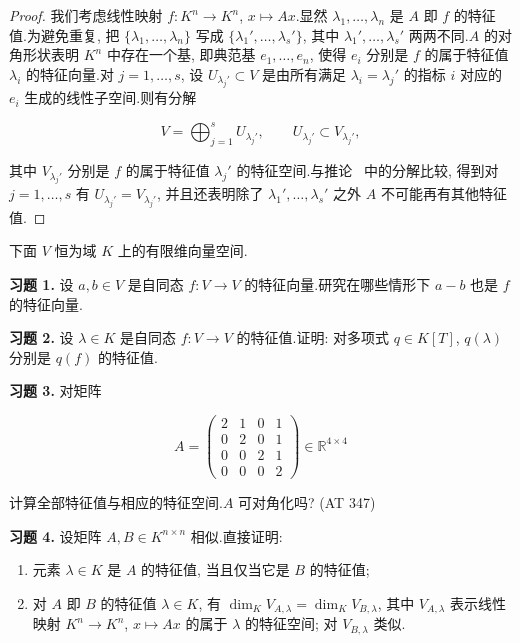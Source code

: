 \begin{proof}
我们考虑线性映射 $f \colon K^n \longrightarrow K^n$, $x \longmapsto Ax$.显然 $\lambda_1, \ldots, \lambda_n$ 是 $A$ 即 $f$ 的特征值.为避免重复, 把 $\{\lambda_1, \ldots, \lambda_n\}$ 写成 $\{\lambda_1', \ldots, \lambda_s'\}$, 其中 $\lambda_1', \ldots, \lambda_s'$ 两两不同.$A$ 的对角形状表明 $K^n$ 中存在一个基, 即典范基 $e_1, \ldots, e_n$, 使得 $e_i$ 分别是 $f$ 的属于特征值 $\lambda_i$ 的特征向量.对 $j = 1, \ldots, s$, 设 $U_{\lambda_j'} \subset V$ 是由所有满足 $\lambda_i = \lambda_j'$ 的指标 $i$ 对应的 $e_i$ 生成的线性子空间.则有分解

\[
V = \bigoplus_{j = 1}^{s} U_{\lambda_j'}, \qquad U_{\lambda_j'} \subset V_{\lambda_j'},\]

其中 $V_{\lambda_j'}$ 分别是 $f$ 的属于特征值 $\lambda_j'$ 的特征空间.与推论~ 中的分解比较, 得到对 $j = 1, \ldots, s$ 有 $U_{\lambda_j'} = V_{\lambda_j'}$, 并且还表明除了 $\lambda_1', \ldots, \lambda_s'$ 之外 $A$ 不可能再有其他特征值.
\end{proof}

\aufgaben

下面 $V$ 恒为域 $K$ 上的有限维向量空间.

\noindent\textbf{习题 1.} 设 $a, b \in V$ 是自同态 $f \colon V \longrightarrow V$ 的特征向量.研究在哪些情形下 $a - b$ 也是 $f$ 的特征向量.

\medskip
\noindent\textbf{习题 2.} 设 $\lambda \in K$ 是自同态 $f \colon V \longrightarrow V$ 的特征值.证明: 对多项式 $q \in K[T]$, $q(\lambda)$ 分别是 $q(f)$ 的特征值.

\medskip
\noindent\textbf{习题 3.} 对矩阵

\[
A = \left(\begin{array}{cccc} 2 & 1 & 0 & 1 \\ 0 & 2 & 0 & 1 \\ 0 & 0 & 2 & 1 \\ 0 & 0 & 0 & 2 \end{array}\right) \in \mathbb{R}^{4 \times 4}\]

计算全部特征值与相应的特征空间.$A$ 可对角化吗? (AT 347)

\medskip
\noindent\textbf{习题 4.} 设矩阵 $A, B \in K^{n \times n}$ 相似.直接证明:
\begin{enumerate}
\item[(i)] 元素 $\lambda \in K$ 是 $A$ 的特征值, 当且仅当它是 $B$ 的特征值;
\item[(ii)] 对 $A$ 即 $B$ 的特征值 $\lambda \in K$, 有 $\dim_K V_{A, \lambda} = \dim_K V_{B, \lambda}$, 其中 $V_{A, \lambda}$ 表示线性映射 $K^n \longrightarrow K^n$, $x \longmapsto Ax$ 的属于 $\lambda$ 的特征空间; 对 $V_{B, \lambda}$ 类似.
\end{enumerate}

